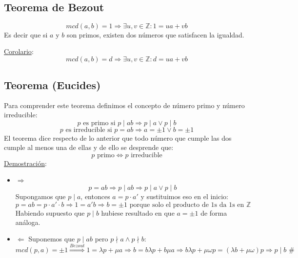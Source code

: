 \documentclass[10pt,a4paper,openright]{book}
\theoremstyle{break}
\begin{document}
\subsection{Teorema de Bezout}
$$mcd(a,b)=1\Rightarrow \exists u,v\in \mathbb Z : 1=ua+vb$$
Es decir que si $a$ y $b$ son primos, existen dos números que satisfacen la igualdad.\par
\underline{Corolario}:
$$mcd(a,b)=d\Rightarrow \exists u,v \in \mathbb Z: d=ua+vb$$

\subsection{Teorema (Eucides)}
Para comprender este teorema definimos el concepto de número primo y número irreducible:
$$p\mbox{ es primo si }p\mid ab\Rightarrow p\mid a \vee p\mid b$$
$$p\mbox{ es irreducible si } p=ab\Rightarrow a=\pm 1 \vee b=\pm 1$$
El teorema dice respecto de lo anterior que todo número que cumple las dos cumple al menos una de ellas y de ello se desprende que:
$$p\mbox{ primo}\Leftrightarrow p\mbox{ irreducible}$$
\underline{Demostración}:
\begin{itemize}
\item $\Rightarrow$
$$p=ab\Rightarrow p\mid ab\Rightarrow p\mid a \vee p\mid b$$
Supongamos que $p\mid a$, entonces $a=p\cdot a'$ y sustituimos eso en el inicio:
$$p=ab=p\cdot a'\cdot b\Rightarrow 1=a'b\Rightarrow b=\pm 1\mbox{ porque solo el producto de 1s da 1s en }\mathbb Z $$
Habiendo supuesto que $p\mid b$ hubiese resultado en que $a=\pm 1$ de forma análoga.

\item $\Leftarrow$
Suponemos que $p\mid ab$ pero $p\nmid a\wedge p\nmid b$:
$$mcd(p,a)=\pm 1\stackrel{Bezout}{\Rightarrow} 1=\lambda p+ \mu a\Rightarrow b=b\lambda p+ b\mu a \Rightarrow b \lambda p+ \mu \omega p=(\lambda b+ \mu \omega)p\Rightarrow p\mid b \mbox{ \#}$$
\end{itemize}
\end{document}
